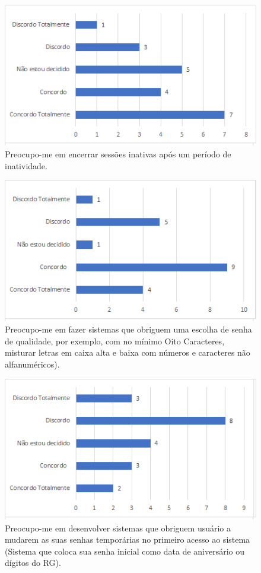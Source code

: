 \begin{figure}[!t]
\centering
\includegraphics[scale=0.7]{figuras das questoes/2.10.png}
\caption{Preocupo-me em encerrar sessões inativas após um período de inatividade.}
\end{figure}

\begin{figure}[!t]
\centering
\includegraphics[scale=0.7]{figuras das questoes/2.11.png}
\caption{Preocupo-me em fazer sistemas que obriguem uma escolha de senha de qualidade, por exemplo, com no mínimo Oito Caracteres, misturar letras em caixa alta e baixa com números e caracteres não alfanuméricos).}
\end{figure}

\begin{figure}[!t]
\centering
\includegraphics[scale=0.7]{figuras das questoes/2.12.png}
\caption{Preocupo-me em desenvolver sistemas que obriguem usuário a mudarem as suas senhas temporárias no primeiro acesso ao sistema (Sistema que coloca sua senha inicial como data de aniversário ou dígitos do RG).}
\end{figure}


